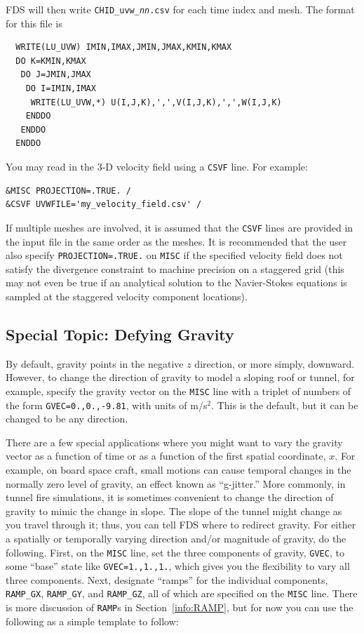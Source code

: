 \documentclass[11pt]{book}
\newcommand{\ct}{\tt\small}
\begin{document}
\noindent FDS will then write {\ct CHID\_uvw\_{\it nn}.csv} for each time index and mesh.  The format for this file is

\footnotesize
\begin{verbatim}
  WRITE(LU_UVW) IMIN,IMAX,JMIN,JMAX,KMIN,KMAX
  DO K=KMIN,KMAX
   DO J=JMIN,JMAX
    DO I=IMIN,IMAX
     WRITE(LU_UVW,*) U(I,J,K),',',V(I,J,K),',',W(I,J,K)
    ENDDO
   ENDDO
  ENDDO
\end{verbatim}
\normalsize

\noindent
You may read in the 3-D velocity field using a {\ct CSVF} line.  For example:

\footnotesize
\begin{verbatim}
&MISC PROJECTION=.TRUE. /
&CSVF UVWFILE='my_velocity_field.csv' /
\end{verbatim}
\normalsize

\noindent If multiple meshes are involved, it is assumed that the {\ct CSVF} lines are provided in the input file in the same order as the meshes.  It is recommended that the user also specify {\ct PROJECTION=.TRUE.} on {\ct MISC} if the specified velocity field does not satisfy the divergence constraint to machine precision on a staggered grid (this may not even be true if an analytical solution to the Navier-Stokes equations is sampled at the staggered velocity component locations).


\subsection{Special Topic: Defying Gravity}
\label{info:GVEC}

By default, gravity points in the negative $z$ direction, or more simply, downward.
However, to change the direction of gravity to model
a sloping roof or tunnel, for example, specify the gravity
vector on the {\ct MISC} line with a triplet of numbers of the form
{\ct GVEC=0.,0.,-9.81},
with units of m/s$^2$. This is the default, but it
can be changed to be any direction.

There are a few special applications where you might want to vary the gravity vector as a function of time
or as a function of the first spatial coordinate, $x$. For example, on board space craft, small motions can
cause temporal changes in the normally zero level of gravity, an effect known as ``g-jitter.'' More commonly, in tunnel
fire simulations, it is sometimes convenient to change the direction of gravity to mimic the change in slope. The slope
of the tunnel might change as you travel through it; thus, you can tell FDS where to redirect gravity.
For either a spatially or temporally varying direction and/or magnitude of gravity, do the following. First, on the
{\ct MISC} line, set the three components of gravity, {\ct GVEC}, to some ``base'' state like {\ct GVEC=1.,1.,1.},
which gives you the flexibility to vary all three components. Next, designate ``ramps'' for the individual components, {\ct RAMP\_GX},
{\ct RAMP\_GY}, and {\ct RAMP\_GZ}, all of which are specified on the {\ct MISC} line. There is more discussion of
{\ct RAMP}s in Section~\ref{info:RAMP}, but for now you can use the following as a simple template to follow:
\end{document}

